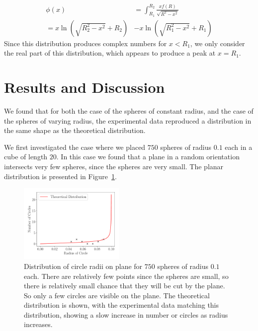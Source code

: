 \documentclass[journal]{IEEEtran}
\begin{document}
\begin{equation}
\begin{split}
  \phi(x) & = \int_{R_1}^{R_2}\frac{xf(R)}{\sqrt{R^2 - x^2}} \\
  = x\ln\left(\sqrt{R_2^2 - x^2}+R_2\right) & - x\ln\left(\sqrt{R_1^2 - x^2}+R_1\right)
\end{split}
\end{equation}
Since this distribution produces complex numbers for $ x < R_1$, we only
consider the real part of this distribution, which appears to produce a peak at
$x = R_1$.

\section{Results and Discussion}

We found that for both the case of the spheres of constant radius, and the case
of the spheres of varying radius, the experimental data reproduced a
distribution in the same shape as the theoretical distribution.

We first investigated the case where we placed $750$ spheres of radius $0.1$
each in a cube of length $20$. In this case we found that a plane in a random
orientation intersects very few spheres, since the spheres are very small. The
planar distribution is presented in Figure~\ref{fig:size1}.

\begin{figure}%
\begin{center}
\includegraphics[width=0.45\textwidth]{images/750_01.pdf}
\caption{Distribution of circle radii on plane for $750$ spheres of radius $0.1$
  each. There are relatively few points since the spheres are small, so there is
  relatively small chance that they will be cut by the plane. So only a few
  circles are visible on the plane. The theoretical distribution is shown, with
  the experimental data matching this distribution, showing a slow increase in
  number or circles as radius increases.}\label{fig:size1}
\end{center}
\end{figure}
\end{document}
